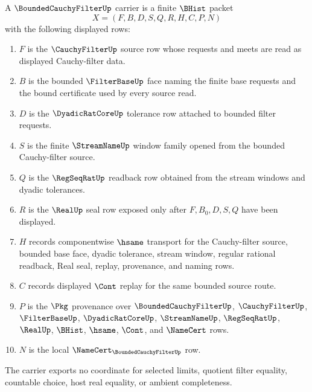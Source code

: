 \begin{definition}
\label{def:bounded-cauchy-filter-carrier}
A $\BoundedCauchyFilterUp$ carrier is a finite $\BHist$ packet
$$
X=(F,B,D,S,Q,R,H,C,P,N)
$$
with the following displayed rows:
\begin{enumerate}
\item $F$ is the $\CauchyFilterUp$ source row whose requests and meets are read as displayed Cauchy-filter data.
\item $B$ is the bounded $\FilterBaseUp$ face naming the finite base requests and the bound certificate used by every source read.
\item $D$ is the $\DyadicRatCoreUp$ tolerance row attached to bounded filter requests.
\item $S$ is the finite $\StreamNameUp$ window family opened from the bounded Cauchy-filter source.
\item $Q$ is the $\RegSeqRatUp$ readback row obtained from the stream windows and dyadic tolerances.
\item $R$ is the $\RealUp$ seal row exposed only after $F,B_0,D,S,Q$ have been displayed.
\item $H$ records componentwise $\hsame$ transport for the Cauchy-filter source, bounded base face, dyadic tolerance, stream window, regular rational readback, Real seal, replay, provenance, and naming rows.
\item $C$ records displayed $\Cont$ replay for the same bounded source route.
\item $P$ is the $\Pkg$ provenance over $\BoundedCauchyFilterUp$, $\CauchyFilterUp$, $\FilterBaseUp$, $\DyadicRatCoreUp$, $\StreamNameUp$, $\RegSeqRatUp$, $\RealUp$, $\BHist$, $\hsame$, $\Cont$, and $\NameCert$ rows.
\item $N$ is the local $\NameCert_{\BoundedCauchyFilterUp}$ row.
\end{enumerate}
The carrier exports no coordinate for selected limits, quotient filter equality, countable choice, host real equality, or ambient completeness.
\end{definition}

